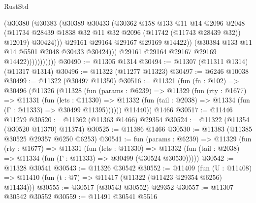 \begin{lexlean}{RustStd}
\begin{coremodule}
                                (@30380
                                  (@30383
                                    (@30389
                                      @30433
                                      (@30362
                                        @158
                                        @133
                                        @11
                                        @14
                                        @2096
                                        @2048
                                        (@11734
                                          @28439
                                          @1838
                                          @32
                                          @11
                                          @32
                                          @2096
                                          (@11742 (@11743 @28439 @32))
                                          @12019)
                                        @30424)))
                                  @29161
                                  @29164
                                  @29167
                                  @29169
                                  @14422))
                              (@30384 @133 @11 @14 @5501 @2048 @30433 @30424)))
                          @29161
                          @29164
                          @29167
                          @29169
                          @14422)))))))))))
@30490 := @11305 @1314
@30494 := @11307 (@11311 @1314) (@11317 @1314)
@30496 := @11322 (@11277 @11323)
@30497 := @6246 @10038
@30499 := @11322 (@30497 @11350)
@30516 := @11321
    (fun (fn : @102) =>
    @30496
      (@11326
        (@11328
          (fun (params : @6239) =>
          @11329
            (fun (rty : @1677) =>
            @11331
              (fun (lets : @11330) =>
              @11332 (fun (tail : @2038) => @11334 (fun (Γ : @11333) => @30499 @11395))))))
        @11440))
    @1466
@30517 := @11446 @11279
@30520 := @11362 (@11363 @1466) @29354
@30524 := @11322 (@11354 (@30520 @11370) @11374)
@30525 := @11386 @1466
@30530 := @11383 (@11385 @30525 @29357 @6250 @6253)
@30541 := fun (params : @6239) =>
  @11329
    (fun (rty : @1677) =>
    @11331
      (fun (lets : @11330) =>
      @11332 (fun (tail : @2038) => @11334 (fun (Γ : @11333) => @30499 (@30524 @30530)))))
@30542 := @11328 @30541
@30543 := @11326 @30542
@30552 := @11409
    (fun (U : @11408) => @11410 (fun (t : @7) => @11417 (@11322 (@11423 @29354 @6256) @11434)))
@30555 := @30517 (@30543 @30552) @29352
@30557 := @11307 @30542 @30552
@30559 := @11491 @30541 @5516

\end{coremodule}
\end{lexlean}

